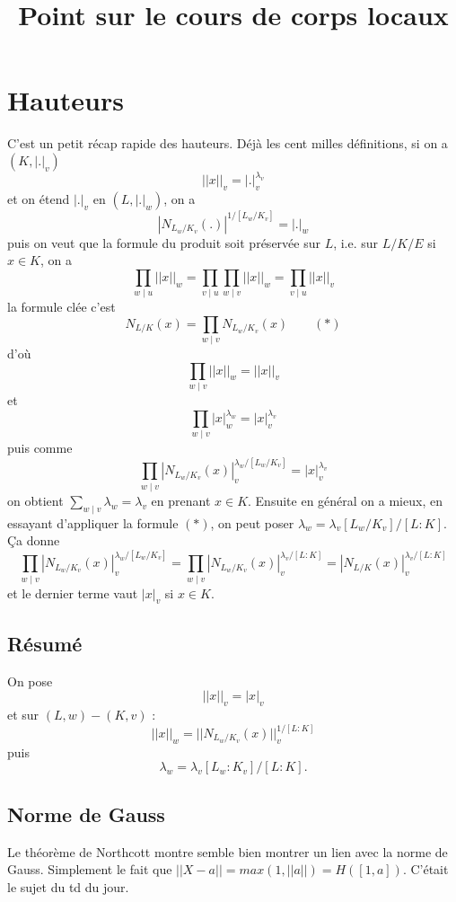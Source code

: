 \documentclass[a4paper,12pt]{book}
\title{Point sur le cours de corps locaux }
\date{}
\theoremstyle{plain}
\theoremstyle{definition}
\theoremstyle{remark}
\begin{document}
\maketitle
\chapter{Hauteurs}
C'est un petit récap rapide des hauteurs. Déjà les cent milles 
définitions, si on a $(K,|.|_v)$
\[||x||_v=|.|_v^{\lambda_v}\]
et on étend $|.|_v$ en $(L,|.|_w)$, on a 
\[|N_{L_w/K_v}(.)|^{1/[L_w/K_v]}=|.|_w\]
puis on veut que la formule du produit soit préservée sur $L$, i.e.
sur $L/K/E$ si $x\in K$, on a 
\[\prod_{w\mid u} ||x||_w= \prod_{v\mid u}\prod_{w\mid v}||x||_w=
\prod_{v\mid u} ||x||_v\]
la formule clée c'est
\[N_{L/K}(x)=\prod_{w\mid v} N_{L_w/K_v}(x)\qquad (*)\]
d'où 
\[\prod_{w\mid v}||x||_w=||x||_v\]
et 
\[\prod_{w\mid v}|x|_w^{\lambda_w}=|x|_v^{\lambda_v}\]
puis comme 
\[\prod_{w\mid v}|N_{L_w/K_v}(x)|_v^{\lambda_w/[L_w/K_v]}=
|x|_v^{\lambda_v}\]
on obtient $\sum_{w\mid v} \lambda_w=\lambda_v$ en prenant $x\in K$. 
Ensuite en général on a mieux, en essayant d'appliquer la formule $(*)$,
on peut poser $\lambda_w=\lambda_v[L_w/K_v]/[L:K]$. Ça donne
\[\prod_{w\mid v}|N_{L_w/K_v}(x)|_v^{\lambda_w/[L_w/K_v]}=
\prod_{w\mid v}|N_{L_w/K_v}(x)|_v^{\lambda_v/[L:K]}=|N_{L/K}(x)|_v^{\lambda_v/[L:K]}\]
et le dernier terme vaut $|x|_v$ si $x\in K$.


\section{Résumé}
On pose 
\[||x||_v=|x|_v\]
et sur $(L,w)-(K,v)$ :
\[||x||_w=||N_{L_w/K_v}(x)||_v^{1/[L:K]}\]
puis \[\lambda_w = \lambda_v [L_w:K_v]/[L:K].\]

\section{Norme de Gauss}
Le théorème de Northcott montre semble bien montrer un lien avec la norme
de Gauss. Simplement le fait que $||X-a||=max(1,||a||)=H([1,a])$.
C'était le sujet du td du jour.
\end{document}

